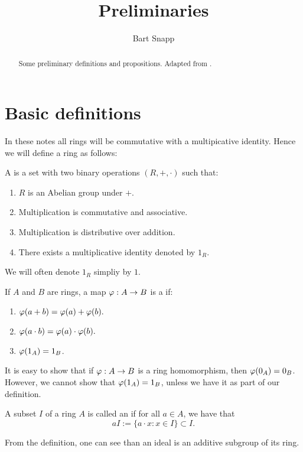 \documentclass{ximera}
\author{Bart Snapp}
\title{Preliminaries}
\begin{document}
\begin{abstract}
  Some preliminary definitions and propositions. Adapted from \cite{sD2008}.
\end{abstract}
\maketitle

\section{Basic definitions}

In these notes all rings will be commutative with a multipicative
identity. Hence we will define a ring as follows:

\begin{definition} A  is a set with two binary operations $(R, +,\cdot)$ such that:
\begin{enumerate}
\item $R$ is an Abelian group under $+$.
\item Multiplication is commutative and associative. 
\item Multiplication is distributive over addition.
\item There exists a multiplicative identity denoted by $1_R$. 
\end{enumerate}
\end{definition}

We will often denote $1_R$ simpliy by $1$.

\begin{definition} If $A$ and $B$ are rings, a map $\varphi:A\to B$ is a  if:
\begin{enumerate}
\item $\varphi(a+b) = \varphi(a) + \varphi(b).$
\item $\varphi(a\cdot b) = \varphi(a)\cdot\varphi(b).$
\item $\varphi(1_A) = 1_B$.
\end{enumerate}
\end{definition}
It is easy to show that if $\varphi:A\to B$ is a ring homomorphism, then $\varphi(0_A) = 0_B$. However, we cannot show that $\varphi(1_A) = 1_B$, unless we have it as part of our definition.


\begin{definition} A subset $I$ of a ring $A$ is called an  if for all $a\in A$, we have that
\[
aI := \{a\cdot x: x\in I\} \subset I.
\]
\end{definition}
From the definition, one can see than an ideal is an additive subgroup of its ring.
\end{document}
